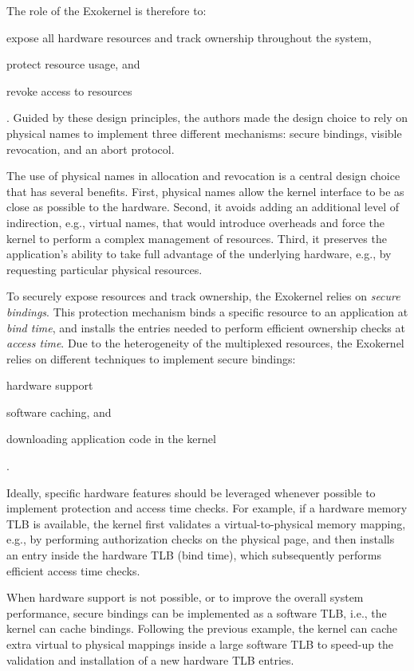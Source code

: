 The role of the Exokernel is therefore to:
\begin{enumerate*}
	\item \label{expose} expose all hardware resources and track ownership throughout the system,
	\item \label{protect} protect resource usage, and
	\item \label{revoke} revoke access to resources
\end{enumerate*}.
Guided by these design principles, the authors made the design choice to rely on physical names to implement three different mechanisms: secure bindings, visible revocation, and an abort protocol.

The use of physical names in allocation and revocation is a central design choice that has several benefits.
First, physical names allow the kernel interface to be as close as possible to the hardware.
Second, it avoids adding an additional level of indirection, e.g., virtual names, that would introduce overheads and force the kernel to perform a complex management of resources.
Third, it preserves the application's ability to take full advantage of the underlying hardware, e.g., by requesting particular physical resources.

To securely expose resources and track ownership, the Exokernel relies on \emph{secure bindings}.
This protection mechanism binds a specific resource to an application at \emph{bind time}, and installs the entries needed to perform efficient ownership checks at \emph{access time}.
Due to the heterogeneity of the multiplexed resources, the Exokernel relies on different techniques to implement secure bindings:
\begin{enumerate*}
	\item hardware support
	\item software caching, and
	\item downloading application code in the kernel
\end{enumerate*}.

Ideally, specific hardware features should be leveraged whenever possible to implement protection and access time checks.
For example, if a hardware memory TLB is available, the kernel first validates a virtual-to-physical memory mapping, e.g., by performing authorization checks on the physical page, and then installs an entry inside the hardware TLB (bind time), which subsequently performs efficient access time checks.

When hardware support is not possible, or to improve the overall system performance, secure bindings can be implemented as a software TLB, i.e., the kernel can cache bindings.
Following the previous example, the kernel can cache extra virtual to physical mappings inside a large software TLB to speed-up the validation and installation of a new hardware TLB entries.


